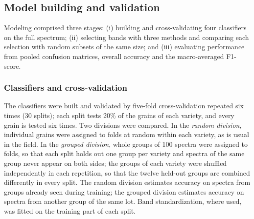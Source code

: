 \documentclass[final,5p,times,twocolumn]{elsarticle}
\begin{document}
\subsection{Model building and validation}

Modeling comprised three stages: (i) building and cross-validating four classifiers on the full spectrum; (ii) selecting bands with three methods and comparing each selection with random subsets of the same size; and (iii) evaluating performance from pooled confusion matrices, overall accuracy and the macro-averaged F1-score.


\subsubsection{Classifiers and cross-validation}\label{sec_building}

The classifiers were built and validated by five-fold cross-validation repeated six times (30 splits); each split tests 20\% of the grains of each variety, and every grain is tested six times. Two divisions were compared. In the \emph{random division}, individual grains were assigned to folds at random within each variety, as is usual in the field. In the \emph{grouped division}, whole groups of 100 spectra were assigned to folds, so that each split holds out one group per variety and spectra of the same group never appear on both sides; the groups of each variety were shuffled independently in each repetition, so that the twelve held-out groups are combined differently in every split. The random division estimates accuracy on spectra from groups already seen during training; the grouped division estimates accuracy on spectra from another group of the same lot. Band standardization, where used, was fitted on the training part of each split.
\end{document}
